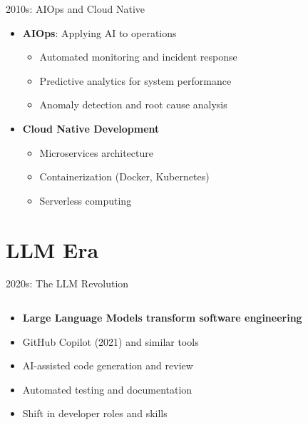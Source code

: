 \documentclass{beamer}
\begin{document}
\begin{frame}{2010s: AIOps and Cloud Native}
\begin{itemize}
    \item \textbf{AIOps}: Applying AI to operations
    \begin{itemize}
        \item Automated monitoring and incident response
        \item Predictive analytics for system performance
        \item Anomaly detection and root cause analysis
    \end{itemize}
    \item \textbf{Cloud Native Development}
    \begin{itemize}
        \item Microservices architecture
        \item Containerization (Docker, Kubernetes)
        \item Serverless computing
    \end{itemize}
\end{itemize}
\begin{center}
\end{center}
\end{frame}

\section{LLM Era}

\begin{frame}{2020s: The LLM Revolution}
\begin{columns}
    \begin{column}{0.6\textwidth}
        \begin{itemize}
            \item \textbf{Large Language Models transform software engineering}
            \item GitHub Copilot (2021) and similar tools
            \item AI-assisted code generation and review
            \item Automated testing and documentation
            \item Shift in developer roles and skills
        \end{itemize}
    \end{column}
    \begin{column}{0.4\textwidth}
    \end{column}
\end{columns}
\end{frame}
\end{document}
